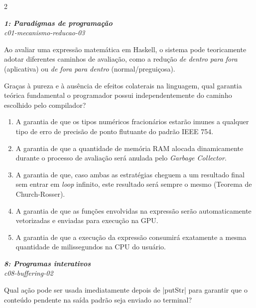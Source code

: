 \documentclass[a4paper,10pt,brazil]{article}
\begin{document}
\begin{multicols}{2}
\begin{enumerate}
\end{enumerate}

\begin{flushright}
  \footnotesize
  \textit{\textbf{1: Paradigmas de programação}}\\
  \textit{c01-mecanismo-reducao-03}\\

\end{flushright}
Ao avaliar uma expressão matemática em Haskell, o sistema pode teoricamente adotar diferentes caminhos de avaliação, como a redução \emph{de dentro para fora} (aplicativa) ou \emph{de fora para dentro} (normal/preguiçosa). 

Graças à pureza e à ausência de efeitos colaterais na linguagem, qual garantia teórica fundamental o programador possui independentemente do caminho escolhido pelo compilador?

\begin{enumerate}
  \item A garantia de que os tipos numéricos fracionários estarão imunes a qualquer tipo de erro de precisão de ponto flutuante do padrão IEEE 754.

  \item A garantia de que a quantidade de memória RAM alocada dinamicamente durante o processo de avaliação será anulada pelo \emph{Garbage Collector}.

  \item A garantia de que, caso ambas as estratégias cheguem a um resultado final sem entrar em \emph{loop} infinito, este resultado será sempre o mesmo (Teorema de Church-Rosser).

  \item A garantia de que as funções envolvidas na expressão serão automaticamente vetorizadas e enviadas para execução na GPU.

  \item A garantia de que a execução da expressão consumirá exatamente a mesma quantidade de milissegundos na CPU do usuário.


\end{enumerate}

\begin{flushright}
  \footnotesize
  \textit{\textbf{8: Programas interativos}}\\
  \textit{c08-buffering-02}\\

\end{flushright}
Qual ação pode ser usada imediatamente depois de \haskellinline|putStr| para garantir que o conteúdo pendente na saída padrão seja enviado ao terminal?


\end{multicols}
\end{document}

